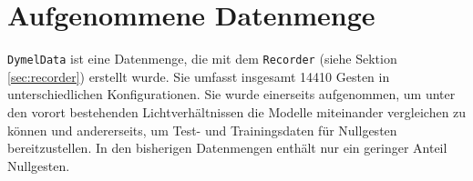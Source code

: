 \section{Aufgenommene Datenmenge}
\label{sec:DymelData}
\texttt{DymelData} ist eine Datenmenge, die mit dem \texttt{Recorder} (siehe Sektion \ref{sec:recorder}) erstellt wurde. Sie umfasst insgesamt 14410 Gesten in unterschiedlichen Konfigurationen. Sie wurde
einerseits aufgenommen, um unter den vorort bestehenden Lichtverhältnissen die Modelle miteinander vergleichen zu können und andererseits, um Test- und Trainingsdaten für Nullgesten bereitzustellen. In den
bisherigen Datenmengen enthält nur ein geringer Anteil Nullgesten.
\newline
\newline
{}
